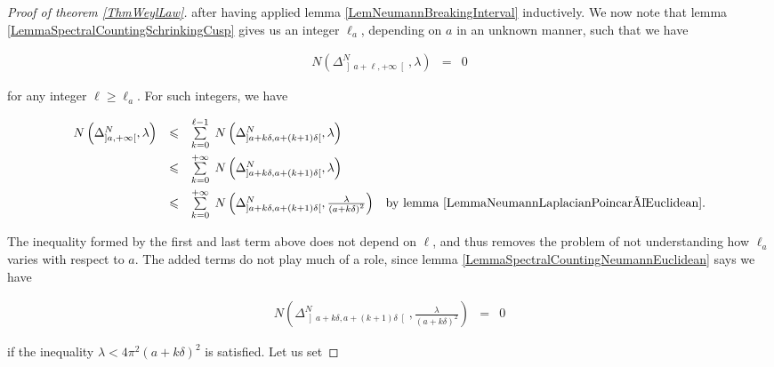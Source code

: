 \documentclass{jams-l}
\theoremstyle{definition}
\theoremstyle{remark}
\numberwithin{equation}{section}
\begin{document}
\begin{proof}[Proof of theorem \ref{ThmWeylLaw}]
            \noindent after having applied lemma \ref{LemNeumannBreakingInterval} inductively. We now note that lemma \ref{LemmaSpectralCountingSchrinkingCusp} gives us an integer $\ell_a$, depending on $a$ in an unknown manner, such that we have
            
            \[ \begin{array}{lll}
                     N \left( \Delta^N_{\left] a + \ell, + \infty \right[}, \lambda \right) & = & 0
                \end{array} \]
            
            \noindent for any integer $\ell \geqslant \ell_a$. For such integers, we have
            
            \[ \begin{array}{llllll}
                    N \left( \Delta^N_{\left] a, + \infty \right[}, \lambda \right) & \leqslant & \sum\limits_{k=0}^{\ell - 1} \; N \left( \Delta^N_{\left] a+k \delta, a+\left( k+1 \right) \delta \right[}, \lambda \right) \\[1em]
                    
                    & \leqslant & \sum\limits_{k=0}^{+ \infty} \; N \left( \Delta^N_{\left] a+k \delta, a+\left( k+1 \right) \delta \right[}, \lambda \right) \\[1em]
                    
                    & \leqslant & \sum\limits_{k=0}^{+ \infty} \; N \left( \Delta^N_{\left] a+k \delta, a+\left( k+1 \right) \delta \right[}, \frac{\lambda}{\left( a + k \delta \right)^2} \right) & \text{by lemma \ref{LemmaNeumannLaplacianPoincaréEuclidean}}.
                \end{array} \]
            
            \noindent The inequality formed by the first and last term above does not depend on $\ell$, and thus removes the problem of not understanding how $\ell_a$ varies with respect to $a$. The added terms do not play much of a role, since lemma \ref{LemmaSpectralCountingNeumannEuclidean} says we have
            
            \[ \begin{array}{lll}
                    N \left( \Delta^N_{\left] a+k \delta, a+\left( k+1 \right) \delta \right[}, \frac{\lambda}{\left( a + k \delta \right)^2} \right) & = & 0
                \end{array} \]
            
            \noindent if the inequality $\lambda < 4 \pi^2 \left( a + k \delta \right)^2$ is satisfied. Let us set
            

\end{proof}
\end{document}
